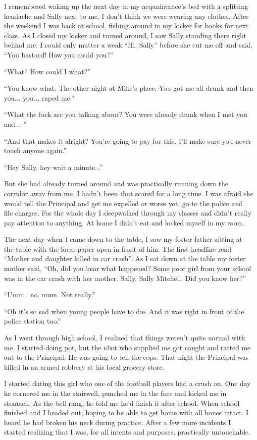 \documentclass[12pt,letterpaper]{article}
\begin{document}
I remembered waking up the next day in my acquaintance's bed with a splitting headache and Sally next to me. I don't think we were wearing any clothes. After the weekend I was back at school, fishing around in my locker for books for next class. As I closed my locker and turned around, I saw Sally standing there right behind me. I could only mutter a weak ``Hi, Sally'' before she cut me off and said, ``You bastard! How you could you?''

``What? How could I what?''

``You know what. The other night at Mike's place. You got me all drunk and then you... you... raped me.''

``What the fuck are you talking about? You were already drunk when I met you and... ''

``And that makes it alright? You're going to pay for this. I'll make sure you never touch anyone again.''

``Hey Sally, hey wait a minute...''

But she had already turned around and was practically running down the corridor away from me. I hadn't been that scared for a long time. I was afraid she would tell the Principal and get me expelled or worse yet, go to the police and file charges. For the whole day I sleepwalked through my classes and didn't really pay attention to anything. At home I didn't eat and locked myself in my room.

The next day when I came down to the table, I saw my foster father sitting at the table with the local paper open in front of him. The first headline read ``Mother and daughter killed in car crash''. As I sat down at the table my foster mother said, ``Oh, did you hear what happened? Some poor girl from your school was in the car crash with her mother. Sally, Sally Mitchell. Did you know her?''

``Umm.. no, mum. Not really.''

``Oh it's so sad when young people have to die. And it was right in front of the police station too.''


As I went through high school, I realized that things weren't quite normal with me. I started doing pot, but the idiot who supplied me got caught and ratted me out to the Principal. He was going to tell the cops. That night the Principal was killed in an armed robbery at his local grocery store. 

I started dating this girl who one of the football players had a crush on. One day he cornered me in the stairwell, punched me in the face and kicked me in stomach. As the bell rang, he told me he'd finish it after school. When school finished and I headed out, hoping to be able to get home with all bones intact, I heard he had broken his neck during practice. After a few more incidents I started realizing that I was, for all intents and purposes, practically untouchable.
\end{document}
